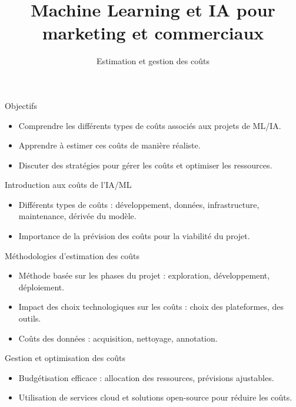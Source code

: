  \title{Machine Learning et IA pour marketing
et commerciaux} \subtitle{Estimation et gestion des coûts}



\begin{frame}
  \titlepage
\end{frame}

\begin{frame}{Objectifs}
  \begin{itemize}
  \item Comprendre les différents types de coûts associés aux projets de ML/IA.
  \item Apprendre à estimer ces coûts de manière réaliste.
  \item Discuter des stratégies pour gérer les coûts et optimiser les ressources.
  \end{itemize}
\end{frame}

\begin{frame}{Introduction aux coûts de l'IA/ML}
  \begin{itemize}
  \item Différents types de coûts : développement, données,
    infrastructure, maintenance, dérivée du modèle.
  \item Importance de la prévision des coûts pour la viabilité du projet.
  \end{itemize}
\end{frame}

\begin{frame}{Méthodologies d'estimation des coûts}
  \begin{itemize}
  \item Méthode basée sur les phases du projet : exploration,
    développement, déploiement.
  \item Impact des choix technologiques sur les coûts : choix des
    plateformes, des outils.
  \item Coûts des données : acquisition, nettoyage, annotation.
  \end{itemize}
\end{frame}

\begin{frame}{Gestion et optimisation des coûts}
  \begin{itemize}
  \item Budgétisation efficace : allocation des ressources, prévisions
    ajustables.
  \item Utilisation de services cloud et solutions open-source pour
    réduire les coûts.
  \end{itemize}

\end{frame}

